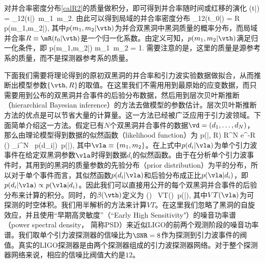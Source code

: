 对并合率密度分布\eqref{calR2}的质量做积分，即可得到并合率随时间或红移的演化
\e
\mR(t|\vth) = \int \mR_{12}(t|\vth)\ \rmd m_1\, \rmd m_2.
\q 
由此可以得到局域的并合率密度分布
\e 
\mR_{12}(t_0|\vth) = R\, p(m_1,m_2|\vth),
\q 
其中$p(m_1,m_2|\vth)$为并合双黑洞中黑洞质量的概率分布，而局域并合率$R \equiv \mR(t_0|\vth)$是一个归一化系数。由定义可知，$p(m_1,m_2|\vth)$满足归一化条件，即
\e 
 \int p(m_1,m_2|\vth) \rmd m_1\, \rmd m_2 = 1.
\q 
需要注意的是，这里的质量是源参考系的质量，而不是探测器参考系的质量。

下面我们需要将理论得到的原初双黑洞的并合率和引力波实验数据做拟合，从而推断出模型参数$\{\vth, R\}$的取值。在这里我们不需用用到\lvc 最原始的应变数据，而只需要用到\lvc 公布的双黑洞并合事件的后验分布数据，然后用到层次贝叶斯推断（hierarchical Bayesian inference）的方法去做模型的参数估计。层次贝叶斯推断方法的优点是可以节省大量的计算量。这一方法已经被广泛应用于引力波领域\citep{Abbott:2016nhf,Abbott:2016drs,TheLIGOScientific:2016pea,Wysocki:2018mpo,Fishbach:2018edt,Mandel:2018mve,Thrane:2018qnx}。下面简单介绍这一方法。假定已有$N$个双黑洞并合事件的数据$\vd = (d_1, \dots, 
d_N)$，那么由理论模型得到数据的似然函数（likelihood function）为\citep{Wysocki:2018mpo,Fishbach:2018edt,Mandel:2018mve,Thrane:2018qnx}
\e\label{likelihood1}
p(\vd|\vth, R) \propto R^{N} e^{-R\, \beta(\vth)} \prod_i^N 
\int \rmd\vla\ p(d_i|\vla)\ p(\vla|\vth),
\q 
其中$\vla \equiv \{m_1, m_2\}$。在上式中$p(d_i|\vla)$为单个引力波事件在给定双黑洞参数$\vla$时得到数据$d_i$的似然函数。由于\lvc 在分析单个引力波事件时，其用到的黑洞的质量参数的先验分布（prior distribution）为平的分布，所以对于单个事件而言，其似然函数$p(d_i|\vla)$和后验分布成正比$p(\vla|d_i)$，即$p(d_i|\vla) \propto p(\vla|d_i)$。因此我们可以直接用\lvc 公开的每个双黑洞并合事件的后验分布\citep{Vallisneri:2014vxa,TheLIGOScientific:2016pea,Biwer:2018osg}来计算的积分。同时，的$\beta(\vth)$定义为
\e 
\beta(\vth) \equiv \int \rmd\vla\ VT(\vla)\ p(\vla|\vth),
\q 
其中$VT(\vla)$为\lvc 可探测的时空体积。我们用半解析的方法\cite{Abbott:2016nhf,Abbott:2016drs}来计算$VT$。在这里我们忽略了黑洞的自旋效应，并且使用``早期高灵敏度”（``Early High Sensitivity"）的噪音功率谱（power spectral density， 简称PSD）来近似LIGO的前两个观测阶段的噪音功率谱。我们取单个引力波探测器的信噪比为$\SNR = 8$作为探测到引力波事件的阀值。真实的LIGO探测器是由两个探测器组成的引力波探测器网络。对于整个探测器网络来说，相应的信噪比阀值大约是$12$。

